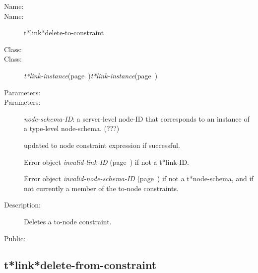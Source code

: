 \begin{description}
\item [Name:]\item [Name:]  t*link*delete-to-constraint

\item [Class:]\item [Class:] {\sl t*link-instance}\hfill(page~\pageref{t*link-instance}){\sl t*link-instance}\hfill(page~\pageref{t*link-instance})

\item [Parameters:]\item [Parameters:]
{\sl node-schema-ID}:  a server-level node-ID that corresponds to an 
instance of a type-level node-schema. (???)

updated to node constraint expression if successful.

Error object {\sl invalid-link-ID} (page~\pageref{invalid-link-ID}) if not a t*link-ID.

Error object {\sl invalid-node-schema-ID} (page~\pageref{invalid-node-schema-ID}) if not a 
t*node-schema, and if not currently a member of the 
to-node constraints.

\item [Description:]

Deletes a to-node constraint.

\item [Public:]



\end{description}
\horizontalline

\subsection{t*link*delete-from-constraint}
\label{t*link*delete-from-constraint}

